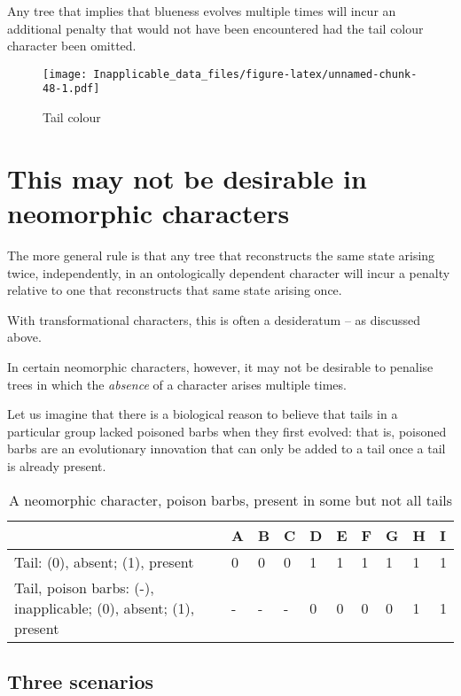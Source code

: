 \documentclass[]{book}
\theoremstyle{definition}
\theoremstyle{definition}
\theoremstyle{definition}
\theoremstyle{remark}
\begin{document}
Any tree that implies that blueness evolves multiple times will incur an
additional penalty that would not have been encountered had the tail
colour character been omitted.

\begin{figure}
\centering
\texttt{[image: Inapplicable\_data\_files/figure-latex/unnamed-chunk-48-1.pdf]}
\caption{\label{fig:unnamed-chunk-48}Tail colour}
\end{figure}

\hypertarget{this-may-not-be-desirable-in-neomorphic-characters}{%
\section{This may not be desirable in neomorphic
characters}\label{this-may-not-be-desirable-in-neomorphic-characters}}

The more general rule is that any tree that reconstructs the same state
arising twice, independently, in an ontologically dependent character
will incur a penalty relative to one that reconstructs that same state
arising once.

With transformational characters, this is often a desideratum -- as
discussed above.

In certain neomorphic characters, however, it may not be desirable to
penalise trees in which the \emph{absence} of a character arises
multiple times.

Let us imagine that there is a biological reason to believe that tails
in a particular group lacked poisoned barbs when they first evolved:
that is, poisoned barbs are an evolutionary innovation that can only be
added to a tail once a tail is already present.

\begin{table}

\caption{\label{tab:unnamed-chunk-49}A neomorphic character, poison barbs, present in some but not all tails}
\centering
\begin{tabular}[t]{l|l|l|l|l|l|l|l|l|l}
\hline
  & A & B & C & D & E & F & G & H & I\\
\hline
Tail: (0), absent; (1), present & 0 & 0 & 0 & 1 & 1 & 1 & 1 & 1 & 1\\
\hline
Tail, poison barbs: (-), inapplicable; (0), absent; (1), present & - & - & - & 0 & 0 & 0 & 0 & 1 & 1\\
\hline
\end{tabular}
\end{table}

\hypertarget{three-scenarios}{%
\subsection{Three scenarios}\label{three-scenarios}}
\end{document}
